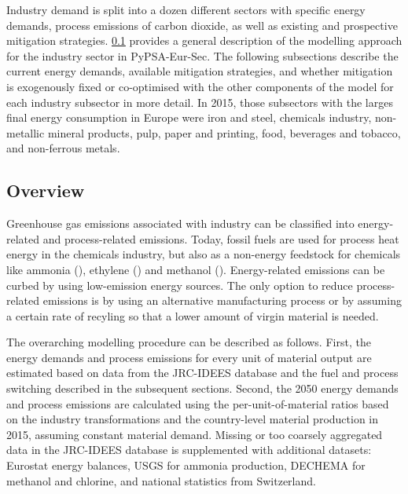 Industry demand is split into a dozen different sectors with specific energy
demands, process emissions of carbon dioxide, as well as existing and
prospective mitigation strategies. \cref{sec:si:industry:overview} provides a
general description of the modelling approach for the industry sector in
PyPSA-Eur-Sec. The following subsections describe the current energy demands,
available mitigation strategies, and whether mitigation is exogenously fixed or
co-optimised with the other components of the model for each industry subsector
in more detail. In 2015, those subsectors with the larges final energy
consumption in Europe were iron and steel, chemicals industry, non-metallic
mineral products, pulp, paper and printing, food, beverages and tobacco, and
non-ferrous metals.

\subsection{Overview}
\label{sec:si:industry:overview}

Greenhouse gas emissions associated with industry can be classified into
energy-related and process-related emissions. Today, fossil fuels are used for
process heat energy in the chemicals industry, but also as a non-energy
feedstock for chemicals like ammonia (), ethylene () and
methanol (). Energy-related emissions can be curbed by using
low-emission energy sources. The only option to reduce process-related emissions
is by using an alternative manufacturing process or by assuming a certain rate
of recyling so that a lower amount of virgin material is needed.

The overarching modelling procedure can be described as follows. First, the
energy demands and process emissions for every unit of material output are
estimated based on data from the JRC-IDEES database and the fuel
and process switching described in the subsequent sections. Second, the 2050
energy demands and process emissions are calculated using the
per-unit-of-material ratios based on the industry transformations and the
country-level material production in 2015, assuming constant
material demand. Missing or too coarsely aggregated data in the JRC-IDEES
database is supplemented with additional datasets: Eurostat energy
balances, USGS for ammonia
production, DECHEMA for
methanol and chlorine, and national
statistics from Switzerland.

